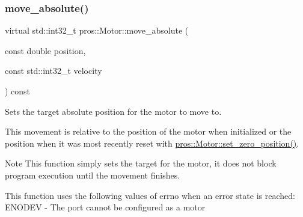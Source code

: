 \subsubsection{\texorpdfstring{move\+\_\+absolute()}{move\_absolute()}}
{\footnotesize\ttfamily virtual std\+::int32\+\_\+t pros\+::\+Motor\+::move\+\_\+absolute (\begin{DoxyParamCaption}\item[{const double}]{position,  }\item[{const std\+::int32\+\_\+t}]{velocity }\end{DoxyParamCaption}) const\hspace{0.3cm}{\ttfamily [virtual]}}



Sets the target absolute position for the motor to move to. 

This movement is relative to the position of the motor when initialized or the position when it was most recently reset with \hyperlink{classpros_1_1Motor_af20c036c1d5d68eb5e762c12f9a4b7fe}{pros\+::\+Motor\+::set\+\_\+zero\+\_\+position()}.

\begin{DoxyNote}{Note}
This function simply sets the target for the motor, it does not block program execution until the movement finishes.
\end{DoxyNote}
This function uses the following values of errno when an error state is reached\+: E\+N\+O\+D\+EV -\/ The port cannot be configured as a motor


